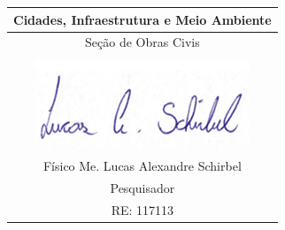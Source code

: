 \begin{table}[h]
  \centering
  \begin{tabular}{c}
    \hline
    Cidades, Infraestrutura e Meio Ambiente \\
    \hline
    Seção de Obras Civis \\
    \hline \\[0.5ex]
    \includegraphics{./figuras/assinatura.png}
    \hline \\[0.5ex]
    Físico Me. Lucas Alexandre Schirbel \\
    Pesquisador \\
    RE: 117113 \\
    \hline
  \end{tabular}
\end{table}
